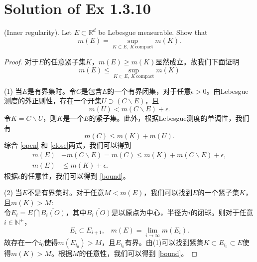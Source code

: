 \documentclass[reqno,a4paper,14pt]{amsart}
\begin{document}
\section{Solution of Ex 1.3.10}
(Inner regularity). Let $E\subset \mathbb{R}^d$ be Lebesgue measurable. Show that 
\begin{equation*}
    m(E)=\sup_{K\subset E,\ K\ \mathrm{compact}} m(K).
\end{equation*}
\begin{proof}
    对于$E$的任意紧子集$K$，$m(E)\geq m(K)$显然成立。故我们下面证明
    \begin{equation}
        m(E)\leq\sup_{K\subset E,\ K\ \mathrm{compact}} m(K)
        \label{bound}
    \end{equation}

    (1) 当$E$是有界集时。令$C$是包含$E$的一个有界闭集，对于任意$\epsilon>0$。由Lebesgue测度的外正则性，存在一个开集$U\supset (C\backslash E)$，且
    \begin{equation}
        m(U)<m(C\backslash E) +\epsilon.
        \label{open}
    \end{equation}
    令$K=C\backslash U$，则$K$是一个$E$的紧子集。此外，根据Lebesgue测度的单调性，我们有
    \begin{equation}
        m(C)\leq m(K)+m(U).
        \label{close}
    \end{equation}
    综合 \eqref{open} 和 \eqref{close}两式，我们可以得到
    \begin{equation*}
        \begin{split}
            m(E)&+m(C\backslash E)=m(C)\leq m(K)+m(C\backslash E) +\epsilon,\\
            m(E)&\leq m(K)+\epsilon.
        \end{split}
    \end{equation*}
    根据$\epsilon$的任意性，我们可以得到 \eqref{bound}。

    (2) 当$E$不是有界集时。对于任意$M<m(E)$，我们可以找到$E$的一个紧子集$K$，且$m(K)>M$:\\令$E_i=E\bigcap \overline{B_i(O)}$，其中$\overline{B_i(O)}$是以原点为中心，半径为$i$的闭球。则对于任意$i\in\mathbb{N}^+$，
    \begin{equation*}
        E_i\subset E_{i+1},\;\;\; m(E)=\lim_{i\to\infty} m(E_i).
    \end{equation*}
    故存在一个$i_0$使得$m(E_{i_0})>M$，且$E_{i_0}$有界。由(1)可以找到紧集$K\subset E_{i_0}\subset E$使得$m(K)>M$。根据$M$的任意性，我们可以得到 \eqref{bound}。

\end{proof}
\end{document}
